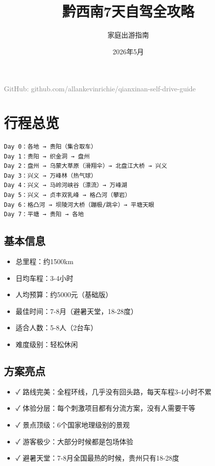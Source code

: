 \documentclass[12pt,a4paper,UTF8]{ctexart}
\title{\Huge \textbf{\textcolor{primary}{黔西南7天自驾全攻略}}}
\author{家庭出游指南}
\date{2026年5月}
\begin{document}
\begin{titlepage}
\maketitle
\thispagestyle{empty}
\vfill
\begin{center}
\textcolor{gray}{GitHub: github.com/allankevinrichie/qianxinan-self-drive-guide}
\end{center}
\end{titlepage}

\newpage
\tableofcontents
\newpage


\section{行程总览}

\begin{verbatim}
Day 0：各地 → 贵阳（集合取车）
Day 1：贵阳 → 织金洞 → 盘州
Day 2：盘州 → 乌蒙大草原（滑翔伞）→ 北盘江大桥 → 兴义
Day 3：兴义 → 万峰林（热气球）
Day 4：兴义 → 马岭河峡谷（漂流）→ 万峰湖
Day 5：兴义 → 贞丰双乳峰 → 格凸河（攀岩）
Day 6：格凸河 → 坝陵河大桥（蹦极/跳伞）→ 平塘天眼
Day 7：平塘 → 贵阳 → 各地
\end{verbatim}

\subsection{基本信息}
\begin{itemize}
\item 总里程：约1500km
\item 日均车程：3-4小时
\item 人均预算：约5000元（基础版）
\item 最佳时间：7-8月（避暑天堂，18-28度）
\item 适合人数：5-8人（2台车）
\item 难度级别：轻松休闲
\end{itemize}

\subsection{方案亮点}
\begin{itemize}
\item ✓ 路线完美：全程环线，几乎没有回头路，每天车程3-4小时不累
\item ✓ 体验分层：每个刺激项目都有分流方案，没有人需要干等
\item ✓ 景点顶级：6个国家地理级别的景观
\item ✓ 游客极少：大部分时候都是包场体验
\item ✓ 避暑天堂：7-8月全国最热的时候，贵州只有18-28度
\end{itemize}
\end{document}
